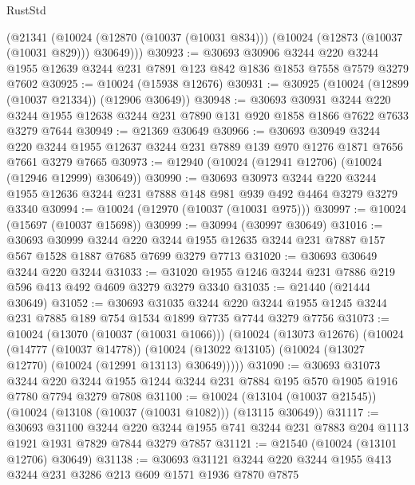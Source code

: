 \begin{lexlean}{RustStd}
\begin{coremodule}
    (@21341
      (@10024 (@12870 (@10037 (@10031 @834))) (@10024 (@12873 (@10037 (@10031 @829))) @30649)))
@30923 := @30693
    @30906
    @3244
    @220
    @3244
    @1955
    @12639
    @3244
    @231
    @7891
    @123
    @842
    @1836
    @1853
    @7558
    @7579
    @3279
    @7602
@30925 := @10024 (@15938 @12676)
@30931 := @30925 (@10024 (@12899 (@10037 @21334)) (@12906 @30649))
@30948 := @30693
    @30931
    @3244
    @220
    @3244
    @1955
    @12638
    @3244
    @231
    @7890
    @131
    @920
    @1858
    @1866
    @7622
    @7633
    @3279
    @7644
@30949 := @21369 @30649
@30966 := @30693
    @30949
    @3244
    @220
    @3244
    @1955
    @12637
    @3244
    @231
    @7889
    @139
    @970
    @1276
    @1871
    @7656
    @7661
    @3279
    @7665
@30973 := @12940 (@10024 (@12941 @12706) (@10024 (@12946 @12999) @30649))
@30990 := @30693
    @30973
    @3244
    @220
    @3244
    @1955
    @12636
    @3244
    @231
    @7888
    @148
    @981
    @939
    @492
    @4464
    @3279
    @3279
    @3340
@30994 := @10024 (@12970 (@10037 (@10031 @975)))
@30997 := @10024 (@15697 (@10037 @15698))
@30999 := @30994 (@30997 @30649)
@31016 := @30693
    @30999
    @3244
    @220
    @3244
    @1955
    @12635
    @3244
    @231
    @7887
    @157
    @567
    @1528
    @1887
    @7685
    @7699
    @3279
    @7713
@31020 := @30693 @30649 @3244 @220 @3244
@31033 := @31020 @1955 @1246 @3244 @231 @7886 @219 @596 @413 @492 @4609 @3279 @3279 @3340
@31035 := @21440 (@21444 @30649)
@31052 := @30693
    @31035
    @3244
    @220
    @3244
    @1955
    @1245
    @3244
    @231
    @7885
    @189
    @754
    @1534
    @1899
    @7735
    @7744
    @3279
    @7756
@31073 := @10024
    (@13070 (@10037 (@10031 @1066)))
    (@10024
      (@13073 @12676)
      (@10024
        (@14777 (@10037 @14778))
        (@10024 (@13022 @13105) (@10024 (@13027 @12770) (@10024 (@12991 @13113) @30649)))))
@31090 := @30693
    @31073
    @3244
    @220
    @3244
    @1955
    @1244
    @3244
    @231
    @7884
    @195
    @570
    @1905
    @1916
    @7780
    @7794
    @3279
    @7808
@31100 := @10024 (@13104 (@10037 @21545)) (@10024 (@13108 (@10037 (@10031 @1082))) (@13115 @30649))
@31117 := @30693
    @31100
    @3244
    @220
    @3244
    @1955
    @741
    @3244
    @231
    @7883
    @204
    @1113
    @1921
    @1931
    @7829
    @7844
    @3279
    @7857
@31121 := @21540 (@10024 (@13101 @12706) @30649)
@31138 := @30693
    @31121
    @3244
    @220
    @3244
    @1955
    @413
    @3244
    @231
    @3286
    @213
    @609
    @1571
    @1936
    @7870
    @7875

\end{coremodule}
\end{lexlean}
